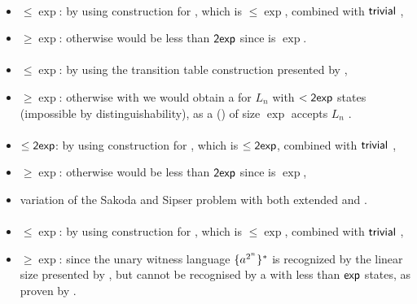 \paragraph{\OLA{}\tto\TNFA}
\begin{itemize}
	\item $\le\exp$: by using construction for \hyperref[cost:1LAto1NFA]{\OLA{}\tto\ONFA}, which is $\le\exp$, combined with $\mathsf{trivial}$ \ONFA{}\tto\TNFA,
	\item $\ge\exp$: otherwise \hyperref[cost:1LAto1DFA]{\OLA{}\tto\ODFA} would be less than $\mathsf{2exp}$ since \TNFA{}\tto\ODFA is $\exp$.
\end{itemize}
\paragraph{\ODLA{}\tto\ODFA}\label{cost:1DLAto1DFA}
\begin{itemize}
	\item $\le\exp$: by using the transition table construction presented by ,
	\item $\ge\exp$: otherwise with \hyperref[cost:1DLAto1DFA]{\ODLA{}\tto\ODFA} we would obtain a \ODFA for $L_n$ with $<\mathsf{2exp}$ states (impossible by distinguishability), as a \ODLA (\TDFA) of size $\exp$ accepts $L_n$ \cite{PigPis14}.
\end{itemize}
\paragraph{\OLA{}\tto\ODLA}
\begin{itemize}
	\item $\le\mathsf{2exp}$: by using construction for \hyperref[cost:1LAto1DFA]{\OLA{}\tto\ODFA}, which is $\le\mathsf{2exp}$, combined with $\mathsf{trivial}$ \ODFA{}\tto\ODLA,
	\item $\ge\exp$: otherwise \hyperref[cost:1LAto1DFA]{\OLA{}\tto\ODFA} would be less than $\mathsf{2exp}$ since \ODLA{}\tto\ODFA is $\exp$,
	\item variation of the Sakoda and Sipser problem with both extended \TNFA and \TDFA.
\end{itemize}
\paragraph{\ODLA{}\tto\TNFA}\label{cost:1DLAto2NFA}
\begin{itemize}
	\item $\le\exp$: by using construction for \hyperref[cost:1DLAto1DFA]{\ODLA{}\tto\ODFA}, which is $\le\exp$, combined with $\mathsf{trivial}$ \ODFA{}\tto\TNFA,
	\item $\ge\exp$: since the unary witness language $\{a^{2^n}\}^*$ is recognized by the linear size \ODLA presented by , but cannot be recognised by a \TNFA with less than $\mathsf{exp}$ states, as proven by .
\end{itemize}
